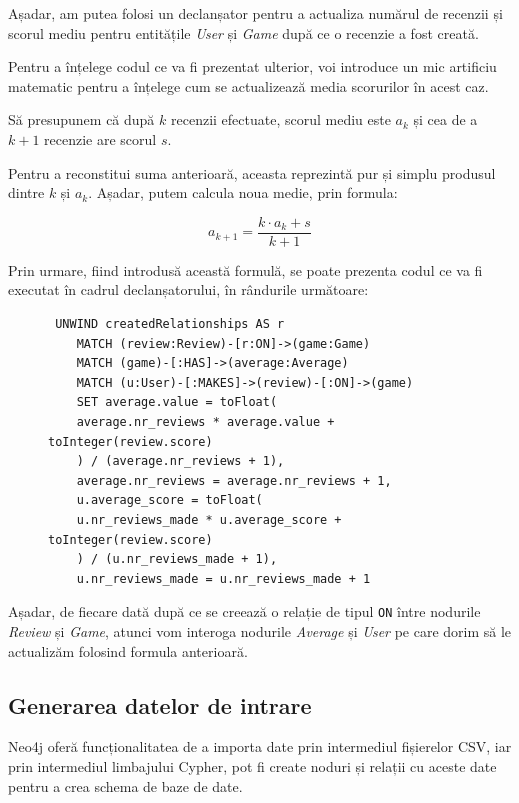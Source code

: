 \documentclass[12pt,a4paper]{report}
\begin{document}
Așadar, am putea folosi un declanșator pentru a actualiza numărul de recenzii și scorul mediu pentru entitățile \emph{User} și \emph{Game} după ce o recenzie a fost creată.

Pentru a înțelege codul ce va fi prezentat ulterior, voi introduce un mic artificiu matematic pentru a înțelege cum se actualizează media scorurilor în acest caz.

\bigskip

Să presupunem că după \( k \) recenzii efectuate, scorul mediu este \( a_k \) și cea de a \( k+1 \) recenzie are scorul \( s \).

Pentru a reconstitui suma anterioară, aceasta reprezintă pur și simplu produsul dintre \( k \) și \( a_k \). Așadar, putem calcula noua medie, prin formula: 

\[ a_{k+1} = \frac{k \cdot a_k + s}{k+1} \]

Prin urmare, fiind introdusă această formulă, se poate prezenta codul ce va fi executat în cadrul declanșatorului, în rândurile următoare:

\begin{figure}[h]
\centering
\begin{BVerbatim}
 UNWIND createdRelationships AS r 
    MATCH (review:Review)-[r:ON]->(game:Game)
    MATCH (game)-[:HAS]->(average:Average)
    MATCH (u:User)-[:MAKES]->(review)-[:ON]->(game)
    SET average.value = toFloat(
    average.nr_reviews * average.value + toInteger(review.score)
    ) / (average.nr_reviews + 1),
	average.nr_reviews = average.nr_reviews + 1,
    u.average_score = toFloat(
    u.nr_reviews_made * u.average_score + toInteger(review.score)
    ) / (u.nr_reviews_made + 1),
    u.nr_reviews_made = u.nr_reviews_made + 1
\end{BVerbatim}
\caption*{}
\end{figure}

Așadar, de fiecare dată după ce se creează o relație de tipul \texttt{ON} între nodurile \emph{Review} și \emph{Game}, atunci vom interoga nodurile \emph{Average} și \emph{User} pe care dorim să le actualizăm folosind formula anterioară.

\subsection{Generarea datelor de intrare}

Neo4j oferă funcționalitatea de a importa date prin intermediul fișierelor CSV, iar prin intermediul limbajului Cypher, pot fi create noduri și relații cu aceste date pentru a crea schema de baze de date.
\end{document}
